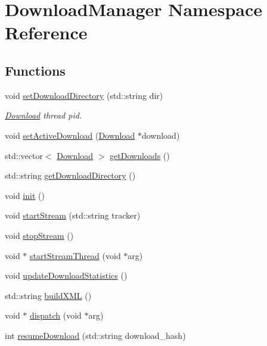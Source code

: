 \hypertarget{namespaceDownloadManager}{
\section{DownloadManager Namespace Reference}
\label{namespaceDownloadManager}
}
\subsection*{Functions}
\begin{DoxyCompactItemize}
\item 
void \hyperlink{namespaceDownloadManager_ac00629fd5d3eef9dcba017c26dc69c19}{setDownloadDirectory} (std::string dir)
\begin{DoxyCompactList}\small\item\em \hyperlink{classDownload}{Download} thread pid. \end{DoxyCompactList}\item 
void \hyperlink{namespaceDownloadManager_a3d8b2eed49e66847b766786040d0265e}{setActiveDownload} (\hyperlink{classDownload}{Download} $\ast$download)
\item 
std::vector$<$ \hyperlink{classDownload}{Download} $>$ \hyperlink{namespaceDownloadManager_a7cb4f8ccac12e400158661b685ea9317}{getDownloads} ()
\item 
std::string \hyperlink{namespaceDownloadManager_a7e7802fe5917fb1302bd079cdbcf501a}{getDownloadDirectory} ()
\item 
void \hyperlink{namespaceDownloadManager_a8de20c15be26ca5209a07ce1d8af3f92}{init} ()
\item 
void \hyperlink{namespaceDownloadManager_a762fd8484d6681566533e51a160843bf}{startStream} (std::string tracker)
\item 
void \hyperlink{namespaceDownloadManager_a9d12843bb98d76ec58279794018e9ab2}{stopStream} ()
\item 
void $\ast$ \hyperlink{namespaceDownloadManager_a2311200cb3aa6faea17e9d20b08e6511}{startStreamThread} (void $\ast$arg)
\item 
void \hyperlink{namespaceDownloadManager_a18e7725a9ba24fdcb5184e6b64fecf13}{updateDownloadStatistics} ()
\item 
std::string \hyperlink{namespaceDownloadManager_aa7899bc404ec1526300d1928a9bb46fb}{buildXML} ()
\item 
void $\ast$ \hyperlink{namespaceDownloadManager_a333470e7007479e694c43588565874f9}{dispatch} (void $\ast$arg)
\item 
int \hyperlink{namespaceDownloadManager_a1ebf83264bb7279c9ab9508fda30372b}{resumeDownload} (std::string download\_\-hash)

\end{DoxyCompactItemize}
